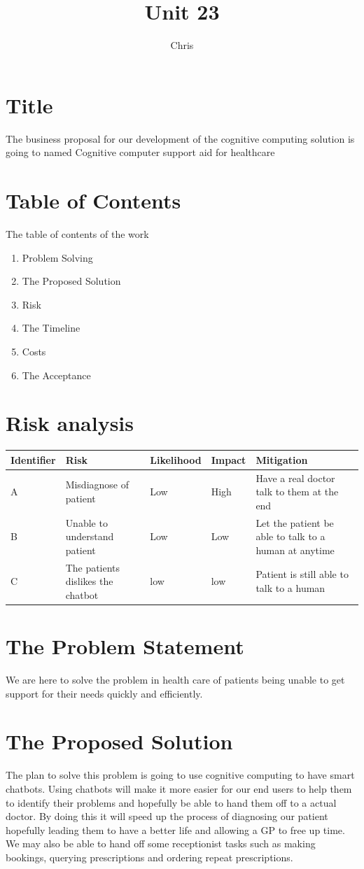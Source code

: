 \documentclass{article}
\title{Unit 23}
\author{Chris}
\date{}
\begin{document}
\section{Title}
The business proposal for our development of the cognitive computing solution is going to named 
Cognitive computer support aid for healthcare

\section{Table of Contents}
The table of contents of the work
\begin{enumerate}
	\item	Problem Solving
	\item	The Proposed Solution
	\item 	Risk
	\item The Timeline
	\item Costs
	\item The Acceptance
\end{enumerate}

\section{Risk analysis}
\begin{center}
	\begin{tabular}{||p{5em}|p{5cm}|p{2cm}|p{2cm}|p{4cm}||}
	\hline
		Identifier & Risk & Likelihood & Impact & Mitigation \\
	\hline
	\hline
		A & Misdiagnose of patient & Low & High & Have a real doctor talk to them at the end \\
	\hline 
		B & Unable to understand patient & Low & Low & Let the patient be able to talk to a human at anytime \\
	\hline
		C & The patients dislikes the chatbot & low & low & Patient is still able to talk to a human \\
	\hline 
\end{tabular}
\end{center}

\section{The Problem Statement}
We are here to solve the problem in health care of patients being unable to get support for their needs quickly and efficiently.

\section{The Proposed Solution}
The plan to solve this problem is going to use cognitive computing to have smart chatbots. Using chatbots will make it more easier for our end users to help them to identify their problems and hopefully be able to hand them off to a actual doctor. By doing this it will speed up the process of diagnosing our patient hopefully leading them to have a better life and allowing a GP to free up time. We may also be able to hand off some receptionist tasks such as making bookings, querying prescriptions and ordering repeat prescriptions.
\end{document}
